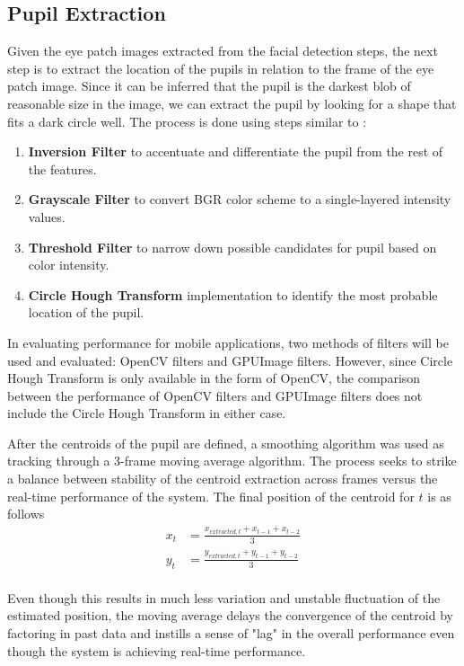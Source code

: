 \documentclass[10pt,twocolumn,letterpaper]{article}
\begin{document}
\subsection{Pupil Extraction}
Given the eye patch images extracted from the facial detection steps, the next step is to extract the location of the pupils in relation to the frame of the eye patch image.  Since it can be inferred that the pupil is the darkest blob of reasonable size in the image, we can extract the pupil by looking for a shape that fits a dark circle well.  The process is done using steps similar to \cite{pupil}:
\begin{enumerate}
\item \textbf{Inversion Filter} to accentuate and differentiate the pupil from the rest of the features.
\item \textbf{Grayscale Filter} to convert BGR color scheme to a single-layered intensity values.
\item \textbf{Threshold Filter} to narrow down possible candidates for pupil based on color intensity.
\item \textbf{Circle Hough Transform} implementation to identify the most probable location of the pupil.
\end{enumerate}

In evaluating performance for mobile applications, two methods of filters will be used and evaluated: OpenCV filters and GPUImage filters.  However, since Circle Hough Transform is only available in the form of OpenCV, the comparison between the performance of OpenCV filters and GPUImage filters does not include the Circle Hough Transform in either case.

After the centroids of the pupil are defined, a smoothing algorithm was used as tracking through a 3-frame moving average algorithm.  The process seeks to strike a balance between stability of the centroid extraction across frames versus the real-time performance of the system.  The final position of the centroid for $t$ is as follows
\begin{equation} \label{eq1}
\begin{split}
x_t & = \frac{x_{extracted,t}+x_{t-1}+x_{t-2}}{3} \\
y_t & = \frac{y_{extracted,t}+y_{t-1}+y_{t-2}}{3} \\
\end{split}
\end{equation}

Even though this results in much less variation and unstable fluctuation of the estimated position, the moving average delays the convergence of the centroid by factoring in past data and instills a sense of "lag" in the overall performance even though the system is achieving real-time performance.
\end{document}
